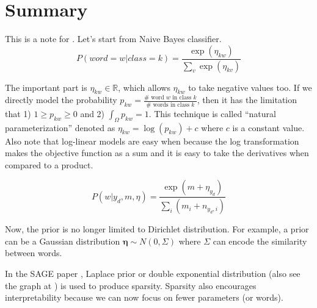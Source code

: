 \documentclass[11pt]{article}
\begin{document}
\section{Summary}

This is a note for \cite{eisenstein2011sparse}.
Let's start from Naive Bayes classifier.
$$
P(word = w|class = k) = \frac{\exp(\eta_{kw})}{\sum_v \exp(\eta_{kv})}
$$

The important part is $\eta_{kw} \in \mathbb{R}$, which allows $\eta_{kw}$ to take negative values too. If we directly model the probability $p_{kw} = \frac{\# \text{ word $w$ in class } k}{\# \text{ words in class } k}$, then it has the limitation that 1) $1 \geq p_{kw} \geq 0$ and 2) $\int_{\Omega} p_{kw} = 1$. This technique is called ``natural parameterization'' denoted as $\eta_{kw} = \log(p_{kw}) + c$ where $c$ is a constant value.
Also note that log-linear models are easy when because the log transformation makes the objective function as a sum and it is easy to take the derivatives when compared to a product.



$$
P(w|y_d, m, \eta) = \frac{\exp(m + \eta_{y_d})}{\sum_i (m_i + n_{y_d, i})}
$$

Now, the prior is no longer limited to Dirichlet distribution. For example, a prior can be a Gaussian distribution $\bm{\eta} \sim N(0, \Sigma)$ where $\Sigma$ can encode the similarity between words.

In the SAGE paper \cite{eisenstein2011sparse}, Laplace prior or double exponential distribution (also see the graph at \cite{laplace_prior}) is used to produce sparsity. 
Sparsity also encourages interpretability because we can now focus on fewer parameters (or words).



\end{document}
